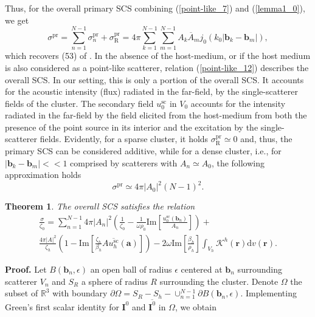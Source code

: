 \documentclass{article}
\newtheorem{theorem}{Theorem}
\begin{document}
Thus, for the overall primary SCS combining (\ref{point-like_7}) and (\ref{lemma1_0}), we get
%
\begin{equation}
    \label{point-like_12}
    \sigma^{\mathrm{pr}}=\sum_{n=1}^{N-1}\sigma_n^{\mathrm{pr}}+\sigma_{\mathrm{R}}^{\mathrm{pr}}=4\pi\sum_{k=1}^{N-1}\sum_{m=1}^{N-1}A_k\overline{A}_mj_0(k_0\lvert\mathbf{b}_k-\mathbf{b}_m\rvert),
\end{equation} 
%
which recovers (53) of \cite{Martin}. In the absence of the host-medium, or if the host medium is also considered as a point-like scatterer, relation (\ref{point-like_12}) describes the overall SCS. In our setting, this is only a portion of the overall SCS. It accounts for the acoustic intensity (flux) radiated in the far-field, by the single-scatterer fields of the cluster. 
The secondary field $u_0^{\mathrm{sc}}$ in $V_0$  accounts for the intensity radiated in the far-field by the field elicited from the host-medium from both the presence of the point source in its interior and the excitation by the single-scatterer fields. Evidently, for a sparse cluster, it holds $\sigma_{\mathrm{R}}^{\mathrm{pr}}\simeq0$ and, thus, the primary SCS can be considered additive, while for a dense cluster, i.e., for $\lvert\mathbf{b}_k-\mathbf{b}_m\rvert<<1$ comprised by scatterers with $A_n\simeq A_0$, the following approximation holds 
%
$$\sigma^{\mathrm{pr}}\simeq4\pi\lvert A_0\rvert^2(N-1)^2.$$
%
%
\begin{theorem}
%
The overall SCS satisfies the relation
%
\begin{align}
\nonumber
\frac{\sigma}{\zeta_0}=\sum_{n=1}^{N-1}4\pi\lvert A_n\rvert^2\left( \frac{1}{\zeta_0}-\frac{1}{\omega\rho_0}\mathrm{Im}\left[\frac{u_0^{\mathrm{sc}}(\mathbf{b}_n)}{A_n}\right]\right)+\\\frac{4\pi\lvert A\rvert^2}{\zeta_h}\left(1-\mathrm{Im}\left[\frac{\zeta_h}{\beta_h}A\overline{u_h^{\mathrm{sc}}}(\mathbf{a})\right]\right)-2\omega\mathrm{Im}\left[\frac{\beta_h}{\rho_h}\right]\int_{V_h}\mathcal{K}^h(\mathbf{r})\mathrm{d}v(\mathbf{r}).
\label{theorem7_0}
\end{align}
\end{theorem}
%
\textbf{Proof.}
%
Let $B(\mathbf{b}_n,\epsilon)$ an open ball of radius $\epsilon$ centered at $\mathbf{b}_n$ surrounding scatterer $V_n$ and $S_R$ a sphere of radius $R$ surrounding the cluster. Denote $\Omega$ the subset of $\mathbb{R}^3$ with boundary $\partial\Omega=S_R-S_h-\cup_{n=1}^{N-1}\partial B(\mathbf{b}_n,\epsilon)$. Implementing Green's first scalar identity for $\mathbf{I}^0$ and $\overline{\mathbf{I}^0}$ in $\Omega$, we obtain
\end{document}
